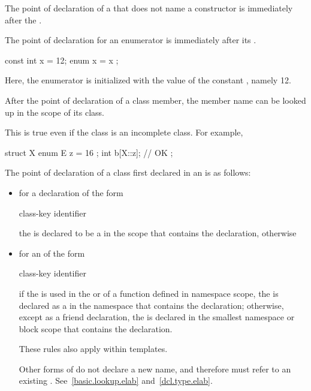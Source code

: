 \pnum
The point of declaration of a  that does not name a
constructor is immediately after the .

\pnum
{}%
The point of declaration for an enumerator is immediately after its
. \begin{example}

\begin{codeblock}
const int x = 12;
{ enum { x = x }; }
\end{codeblock}

Here, the enumerator  is initialized with the value of the
constant , namely 12. \end{example}

\pnum
After the point of declaration of a class member, the member name can be
looked up in the scope of its class. \begin{note}
%
This is true even if the class is an incomplete class. For example,

\begin{codeblock}
struct X {
  enum E { z = 16 };
  int b[X::z];      // OK
};
\end{codeblock}
\end{note}

\pnum
The point of declaration of a class first declared in an
 is as follows:
\begin{itemize}
\item for a declaration of the form

\begin{ncbnf}
class-key  identifier \terminal{;}
\end{ncbnf}

the  is declared to be a
 in the scope that contains the declaration,
otherwise
\item for an  of the form

\begin{ncbnf}
class-key identifier
\end{ncbnf}

if the
 is used in the
 or 
of a function defined in namespace scope, the  is
declared as a  in the namespace that contains the
declaration; otherwise, except as a friend declaration, the
 is declared in the smallest namespace or block
scope that contains the declaration. \begin{note}
These rules also apply within templates. \end{note} \begin{note} Other
forms of  do not declare a new name,
and therefore must refer to an existing .
See~\ref{basic.lookup.elab} and~\ref{dcl.type.elab}. \end{note}
\end{itemize}

